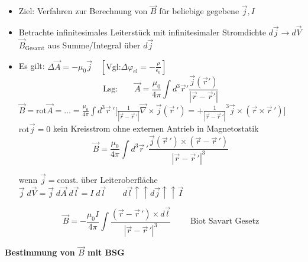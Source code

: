 \documentclass[titlepage,12pt,a4paper,ngerman]{report}
\newcommand{\tx}[1]{\textrm{#1}}
\newcommand{\const}{\tx{const.}}
\begin{document}
\begin{itemize}
	\item Ziel: Verfahren zur Berechnung von $ \vec{B} $ für beliebige gegebene $ \vec{j}, I $
	\item  Betrachte infinitesimales Leiterstück mit infinitesimaler Stromdichte $ d\vec{j} \rightarrow d \vec{V} $ \\
	$ \vec{B}_{\tx{Gesamt}} $ aus Summe/Integral über $ d\vec{j} $
	\item Es gilt: $ \Delta \vec{A} = -\mu_0 \vec{j} \quad [\tx{Vgl:} \Delta \varphi_{\tx{el}} = - \frac{\rho}{\epsilon_0}] $ \\
	$$\tx{Lsg:} \qquad  \vec{A} = \frac{ \mu_0}{4 \pi} \int d^3 \vec{r}' \frac{\vec{j} (\vec{r}')}{|\vec{r} - \vec{r}'|} $$
	$ \vec{B}  = \tx{rot} \vec{A} = \dots = \frac{\mu_0}{4 \pi} \int d^3 \vec{r}\,' \Big[ \frac{1}{|\vec{r} - \vec{r}\,'|} \vec{\nabla} \times \vec{j} (\vec{r}\,')= + \frac{1}{|\vec{r} - \vec{r}\,'|}^3 \vec{j} \times (\vec{r} \times \vec{r}\,')\Big] $\\
	$ \tx{rot} \vec{j} = 0 $ kein Kreisstrom ohne externen Antrieb in Magnetostatik
	$$\boxed{\vec{B} = \frac{\mu_0}{4\pi} \int d^3 \vec{r}\,' \frac{\vec{j} (\vec{r}\,') \times (\vec{r} - \vec{r}\,') }{| \vec{r} - \vec{r}\,'| ^3}}$$
	
	
	wenn $ \vec{j} = \const $ über Leiteroberfläche\\
	$ \vec{j} \; d\vec{V} = \vec{j} \; d\vec{A} \; d\vec{l} = I \; d\vec{l} \qquad d\vec{l} \uparrow \uparrow d\vec{j} \uparrow \uparrow \vec{I}$ 
	
	$$\boxed{\vec{B} = -\frac{\mu_0 I}{4\pi} \int \frac{(\vec{r} - \vec{r}\,') \times d\vec{l} }{| \vec{r} - \vec{r}\,'| ^3}} \qquad \tx{ Biot Savart Gesetz}$$
	
\end{itemize}
\textbf{Bestimmung von $ \vec{B} $ mit BSG}
\end{document}
